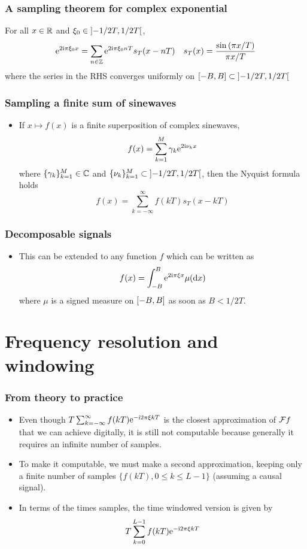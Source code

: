 \begin{frame}
\frametitle{A sampling theorem for complex exponential}
\begin{theorem}
For all $x \in \mathbb{R}$ and  $\xi_0 \in \left]-1/2T,1/2T\right[$,
\[
\mathrm{e}^{2 \mathrm{i} \pi \xi_0 x} = \sum_{n \in \mathbb{Z}} \mathrm{e}^{2 \mathrm{i} \pi \xi_0 n T} s_T(x - nT) \quad s_T(x)= \frac{\sin\left( \pi x/T \right)}{\pi x /T}
\]
where the series in the RHS converges uniformly on $\left[-B,B\right] \subset \left]-1/2T,1/2T\right[$
\end{theorem}
\end{frame}


\begin{frame}
\frametitle{Sampling a finite sum of sinewaves}
\begin{itemize}
\item If $x \mapsto f(x)$ is a finite superposition of complex sinewaves,
\[
f(x)= \sum_{k=1}^M \gamma_k \mathrm{e}^{2 \mathrm{i} \nu_k x}
\]
where $\{\gamma_k\}_{k=1}^M \in \mathbb{C}$ and $\{ \nu_k \}_{k=1}^M \subset \left]-1/2T,1/2T\right[$, then the Nyquist formula holds
\[
f(x)= \sum_{k=-\infty}^{\infty}  f(kT) s_T(x - kT)
\]
\end{itemize}
\end{frame}

\begin{frame}
\frametitle{Decomposable signals}
\begin{itemize}
\item This can be extended to any function $f$ which can be written as
\[
f(x)= \int_{-B}^B \mathrm{e}^{2 \mathrm{i} \pi \xi x} \mu(\mathrm{d} x)
\]
where $\mu$ is a signed measure on $\left[-B,B\right]$ as soon as $B < 1/2T$.
\end{itemize}
\end{frame}


\section{Frequency resolution and windowing}

\begin{frame}
\frametitle{From theory to practice}
\begin{itemize}
\item Even though $T\sum_{k=-\infty}^{\infty} f(kT) \mathrm{e}^{-\mathrm{i} 2 \pi \xi kT}$ is the closest approximation  of $\mathcal{F} f$ that we can achieve digitally, it is still not computable because generally it requires an \alert{infinite number of samples}.
\item To make it computable, we must make a \alert{second approximation}, keeping only a \alert{finite number} of samples $\{ f(kT), 0\leq k \leq L-1\}$ (assuming a \alert{causal} signal).
\item In terms of the times samples, the \alert{time windowed version} is given by
\[
T \sum_{k=0}^{L-1} f(kT) \mathrm{e}^{- \mathrm{i} 2 \pi \xi kT}
\]
\end{itemize}
\end{frame}

